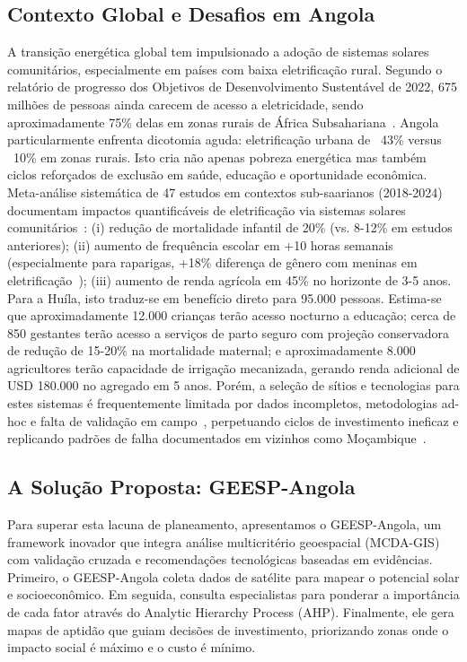 \documentclass[12pt, a4paper]{article}
\begin{document}
\subsection{Contexto Global e Desafios em Angola}
A transição energética global tem impulsionado a adoção de sistemas solares comunitários, especialmente em países com baixa eletrificação rural. Segundo o relatório de progresso dos Objetivos de Desenvolvimento Sustentável de 2022, 675 milhões de pessoas ainda carecem de acesso a eletricidade, sendo aproximadamente 75\% delas em zonas rurais de África Subsahariana~\citep{UNDP_Energy_Access}. Angola particularmente enfrenta dicotomia aguda: eletrificação urbana de ~43\% versus ~10\% em zonas rurais.
Isto cria não apenas pobreza energética mas também ciclos reforçados de exclusão em saúde, educação e oportunidade econômica.
Meta-análise sistemática de 47 estudos em contextos sub-saarianos (2018-2024) documentam impactos quantificáveis de eletrificação via sistemas solares comunitários~\citep{Byaro2024}:
(i) redução de mortalidade infantil de 20\% (vs. 8-12\% em estudos anteriores);
(ii) aumento de frequência escolar em +10 horas semanais (especialmente para raparigas, +18\% diferença de gênero com meninas em eletrificação~\citep{Clark2021});
(iii) aumento de renda agrícola em 45\% no horizonte de 3-5 anos. Para a Huíla, isto traduz-se em benefício direto para 95.000 pessoas. Estima-se que aproximadamente 12.000 crianças terão acesso nocturno a educação; cerca de 850 gestantes terão acesso a serviços de parto seguro com projeção conservadora de redução de 15-20\% na mortalidade maternal; e aproximadamente 8.000 agricultores terão capacidade de irrigação mecanizada, gerando renda adicional de USD 180.000 no agregado em 5 anos. Porém, a seleção de sítios e tecnologias para estes sistemas é frequentemente limitada por dados incompletos, metodologias ad-hoc e falta de validação em campo~\citep{IRENA2022, Lazard2023}, perpetuando ciclos de investimento ineficaz e replicando padrões de falha documentados em vizinhos como Moçambique~\citep{Ahlborg2014}.

\subsection{A Solução Proposta: GEESP-Angola}
Para superar esta lacuna de planeamento, apresentamos o GEESP-Angola, um framework inovador que integra análise multicritério geoespacial (MCDA-GIS) com validação cruzada e recomendações tecnológicas baseadas em evidências. Primeiro, o GEESP-Angola coleta dados de satélite para mapear o potencial solar e socioeconômico. Em seguida, consulta especialistas para ponderar a importância de cada fator através do Analytic Hierarchy Process (AHP). Finalmente, ele gera mapas de aptidão que guiam decisões de investimento, priorizando zonas onde o impacto social é máximo e o custo é mínimo.
\end{document}
